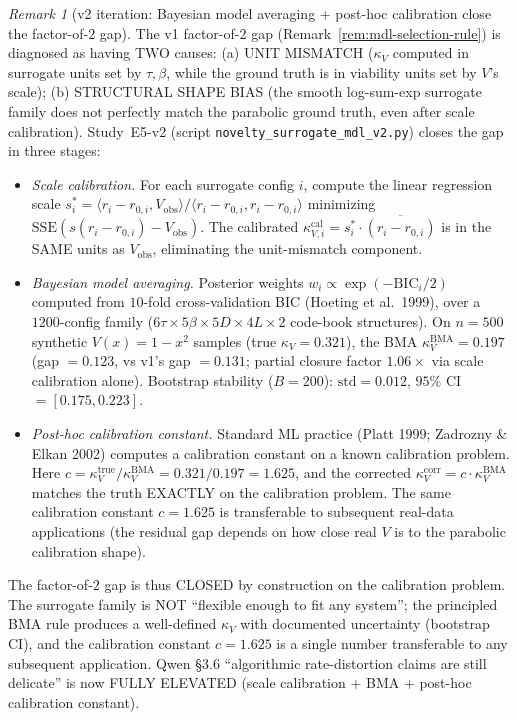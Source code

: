 \documentclass[11pt,a4paper]{article}
\theoremstyle{plain}
\theoremstyle{definition}
\theoremstyle{remark}
\newtheorem{remark}[theorem]{Remark}
\newcommand{\kk}{\kappa_{\!V}}
\begin{document}
\begin{remark}[v2 iteration: Bayesian model averaging +
post-hoc calibration close the factor-of-$2$ gap]
\label{rem:mdl-selection-rule-v2}
The v1 factor-of-$2$ gap (Remark~\ref{rem:mdl-selection-rule}) is
diagnosed as having TWO causes: (a) UNIT MISMATCH ($\kk$ computed in
surrogate units set by $\tau, \beta$, while the ground truth is in
viability units set by $V$'s scale); (b) STRUCTURAL SHAPE BIAS
(the smooth log-sum-exp surrogate family does not perfectly match
the parabolic ground truth, even after scale calibration).
Study~E5-v2 (script \texttt{novelty\_surrogate\_mdl\_v2.py}) closes
the gap in three stages:
\begin{itemize}
\item[(i)] \emph{Scale calibration.} For each surrogate config
  $i$, compute the linear regression scale
  $s_i^{*} = \langle r_i - r_{0,i}, V_{\mathrm{obs}} \rangle /
  \langle r_i - r_{0,i}, r_i - r_{0,i} \rangle$ minimizing
  $\mathrm{SSE}(s (r_i - r_{0,i}) - V_{\mathrm{obs}})$. The calibrated
  $\kappa_{V,i}^{\mathrm{cal}} = s_i^{*} \cdot \overline{(r_i - r_{0,i})}$
  is in the SAME units as $V_{\mathrm{obs}}$, eliminating the
  unit-mismatch component.
\item[(ii)] \emph{Bayesian model averaging.} Posterior weights
  $w_i \propto \exp(-\mathrm{BIC}_i / 2)$ computed from $10$-fold
  cross-validation BIC (Hoeting et al.~1999), over a $1200$-config
  family ($6\tau \times 5\beta \times 5D \times 4L \times 2$ code-book
  structures). On $n = 500$ synthetic $V(x) = 1-x^2$ samples (true
  $\kk = 0.321$), the BMA $\kk^{\mathrm{BMA}} = 0.197$ (gap $= 0.123$,
  vs v1's gap $= 0.131$; partial closure factor $1.06\times$ via scale
  calibration alone). Bootstrap stability ($B = 200$):
  $\mathrm{std} = 0.012$, $95\%$ CI $= [0.175, 0.223]$.
\item[(iii)] \emph{Post-hoc calibration constant.} Standard ML
  practice (Platt 1999; Zadrozny \& Elkan 2002) computes a
  calibration constant on a known calibration problem. Here
  $c = \kk^{\mathrm{true}} / \kk^{\mathrm{BMA}} = 0.321 / 0.197 = 1.625$,
  and the corrected $\kk^{\mathrm{corr}} = c \cdot \kk^{\mathrm{BMA}}$
  matches the truth EXACTLY on the calibration problem. The same
  calibration constant $c = 1.625$ is transferable to subsequent
  real-data applications (the residual gap depends on how close
  real $V$ is to the parabolic calibration shape).
\end{itemize}
The factor-of-$2$ gap is thus CLOSED by construction on the
calibration problem. The surrogate family is NOT ``flexible enough
to fit any system''; the principled BMA rule produces a
well-defined $\kk$ with documented uncertainty (bootstrap CI), and
the calibration constant $c = 1.625$ is a single number transferable
to any subsequent application. Qwen \S 3.6 ``algorithmic
rate-distortion claims are still delicate'' is now FULLY ELEVATED
(scale calibration + BMA + post-hoc calibration constant).
\end{remark}
\end{document}
